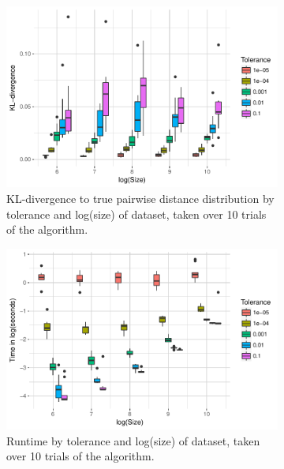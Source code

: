 \documentclass{article}
\begin{document}
\begin{figure}
    \begin{subfigure}{0.5\textwidth}
        \includegraphics[width=\linewidth]{Figures/PairwiseDistance/div_by_size_and_tol.pdf}
        \caption{KL-divergence to true pairwise distance distribution by tolerance and log(size) of dataset, taken over 10 trials of the algorithm.}
        \label{fig:PDDivBySize}
    \end{subfigure}
    \begin{subfigure}{0.5\textwidth}
        \includegraphics[width=\linewidth]{Figures/PairwiseDistance/time_by_size_and_tol.pdf}
        \caption{Runtime by tolerance and log(size) of dataset, taken over 10 trials of the algorithm.}
        \label{fig:PDTimeBySize}
    \end{subfigure}
    \begin{subfigure}{0.5\textwidth}

\end{subfigure}
\end{figure}
\end{document}
